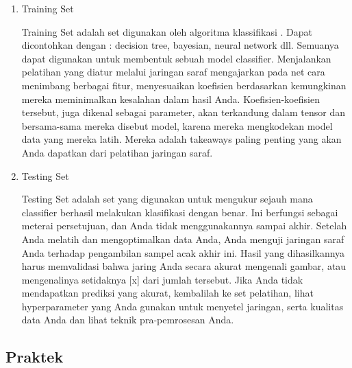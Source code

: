 \begin{enumerate}
    \item{Training Set}
    \par Training Set adalah set digunakan oleh algoritma klassifikasi . Dapat dicontohkan dengan : decision tree, bayesian, neural network dll. Semuanya dapat digunakan untuk membentuk sebuah model classifier. Menjalankan pelatihan yang diatur melalui jaringan saraf mengajarkan pada net cara menimbang berbagai fitur, menyesuaikan koefisien berdasarkan kemungkinan mereka meminimalkan kesalahan dalam hasil Anda. Koefisien-koefisien tersebut, juga dikenal sebagai parameter, akan terkandung dalam tensor dan bersama-sama mereka disebut model, karena mereka mengkodekan model data yang mereka latih. Mereka adalah takeaways paling penting yang akan Anda dapatkan dari pelatihan jaringan saraf.

    \item{Testing Set}
    \par Testing Set adalah set yang digunakan untuk mengukur sejauh mana classifier berhasil melakukan klasifikasi dengan benar. Ini berfungsi sebagai meterai persetujuan, dan Anda tidak menggunakannya sampai akhir. Setelah Anda melatih dan mengoptimalkan data Anda, Anda menguji jaringan saraf Anda terhadap pengambilan sampel acak akhir ini. Hasil yang dihasilkannya harus memvalidasi bahwa jaring Anda secara akurat mengenali gambar, atau mengenalinya setidaknya [x] dari jumlah tersebut. Jika Anda tidak mendapatkan prediksi yang akurat, kembalilah ke set pelatihan, lihat hyperparameter yang Anda gunakan untuk menyetel jaringan, serta kualitas data Anda dan lihat teknik pra-pemrosesan Anda.
\end{enumerate}


\subsection{Praktek}
